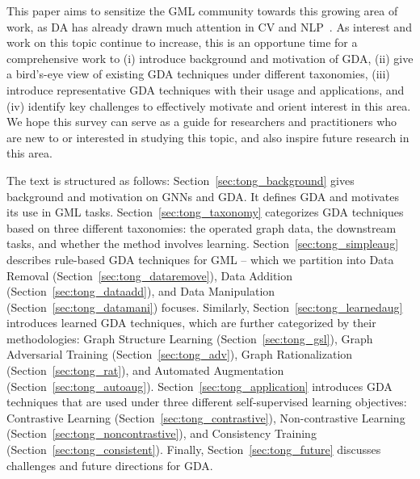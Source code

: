 \documentclass[11pt]{article}
\begin{document}
This paper aims to sensitize the GML community towards this growing area of work, as DA has already drawn much attention in CV and NLP~\cite{cubuk2019autoaugment,feng2021survey}.
As interest and work on this topic continue to increase, this is an opportune time for a comprehensive work to (i) introduce background and motivation of GDA, (ii) give a bird's-eye view of existing GDA techniques under different taxonomies, (iii) introduce representative GDA techniques with their usage and applications, and (iv) identify key challenges to effectively motivate and orient interest in this area.
We hope this survey can serve as a guide for researchers and practitioners who are new to or interested in studying this topic, and also inspire future research in this area.

The text is structured as follows: Section~\ref{sec:tong_background} gives background and motivation on GNNs and GDA. It defines GDA and motivates its use in GML tasks.
Section~\ref{sec:tong_taxonomy} categorizes GDA techniques based on three different taxonomies: the operated graph data, the downstream tasks, and whether the method involves learning. Section~\ref{sec:tong_simpleaug} describes rule-based GDA techniques for GML -- which we partition into Data Removal (Section~\ref{sec:tong_dataremove}), Data Addition (Section~\ref{sec:tong_dataadd}), and Data Manipulation (Section~\ref{sec:tong_datamani}) focuses. Similarly, Section~\ref{sec:tong_learnedaug} introduces learned GDA techniques, which are further categorized by their methodologies: Graph Structure Learning (Section~\ref{sec:tong_gsl}), Graph Adversarial Training (Section~\ref{sec:tong_adv}), Graph Rationalization (Section~\ref{sec:tong_rat}), and Automated Augmentation (Section~\ref{sec:tong_autoaug}).
Section~\ref{sec:tong_application} introduces GDA techniques that are used under three different self-supervised learning objectives: Contrastive Learning (Section~\ref{sec:tong_contrastive}), Non-contrastive Learning (Section~\ref{sec:tong_noncontrastive}), and Consistency Training (Section~\ref{sec:tong_consistent}). Finally, Section~\ref{sec:tong_future} discusses challenges and future directions for GDA.
\end{document}
